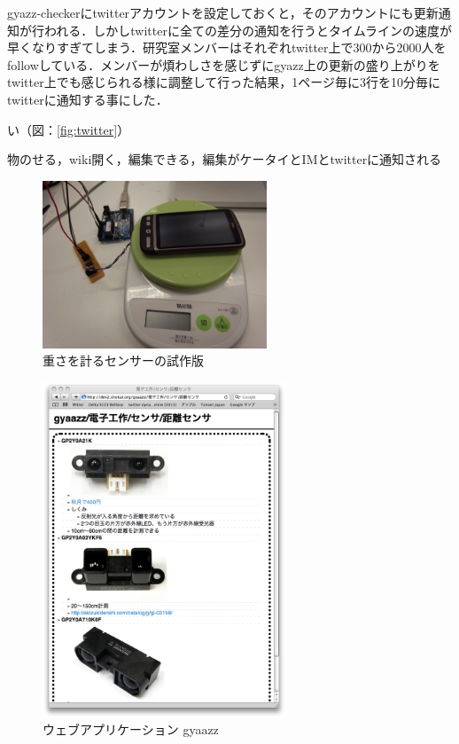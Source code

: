 gyazz-checkerにtwitterアカウントを設定しておくと，そのアカウントにも更新通知が行われる．しかしtwitterに全ての差分の通知を行うとタイムラインの速度が早くなりすぎてしまう．研究室メンバーはそれぞれtwitter上で300から2000人をfollowしている．メンバーが煩わしさを感じずにgyazz上の更新の盛り上がりをtwitter上でも感じられる様に調整して行った結果，1ページ毎に3行を10分毎にtwitterに通知する事にした．




い（図：\ref{fig:twitter}）

物のせる，wiki開く，編集できる，編集がケータイとIMとtwitterに通知される


\begin{figure}
  \begin{center}
    \includegraphics[height=50mm]{img/sensor.png}
  \end{center}
  \caption{重さを計るセンサーの試作版}
  \label{fig:sensor}
\end{figure}

\begin{figure}
  \begin{center}
    \includegraphics[height=100mm]{img/gyaazz.png}
  \end{center}
  \caption{ウェブアプリケーション gyaazz}
  \label{fig:gyaazz}
\end{figure}


